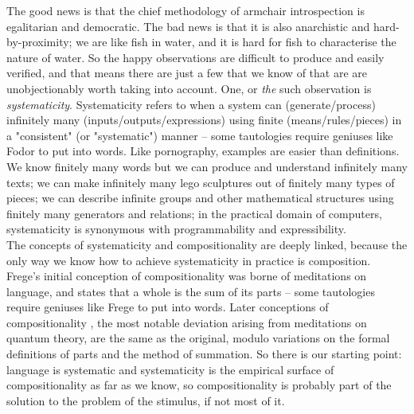 \begin{fullwidth}
 The good news is that the chief methodology of armchair introspection is egalitarian and democratic. The bad news is that it is also anarchistic and hard-by-proximity; we are like fish in water, and it is hard for fish to characterise the nature of water. So the happy observations are difficult to produce and easily verified, and that means there are just a few that we know of that are are unobjectionably worth taking into account. One, or \emph{the} such observation is \emph{systematicity}. Systematicity \citep{} refers to when a system can (generate/process) infinitely many (inputs/outputs/expressions) using finite (means/rules/pieces) in a "consistent" (or "systematic") manner -- some tautologies require geniuses like Fodor to put into words. Like pornography, examples are easier than definitions. We know finitely many words but we can produce and understand infinitely many texts; we can make infinitely many lego sculptures out of finitely many types of pieces; we can describe infinite groups and other mathematical structures using finitely many generators and relations; in the practical domain of computers, systematicity is synonymous with programmability and expressibility.\\

The concepts of systematicity and compositionality are deeply linked, because the only way we know how to achieve systematicity in practice is composition. Frege's initial conception of compositionality \citep{} was borne of meditations on language, and states that a whole is the sum of its parts -- some tautologies require geniuses like Frege to put into words. Later conceptions of compositionality \citep{}, the most notable deviation arising from meditations on quantum theory, are the same as the original, modulo variations on the formal definitions of parts and the method of summation. So there is our starting point: language is systematic and systematicity is the empirical surface of compositionality as far as we know, so compositionality is probably part of the solution to the problem of the stimulus, if not most of it.\\


\end{fullwidth}
